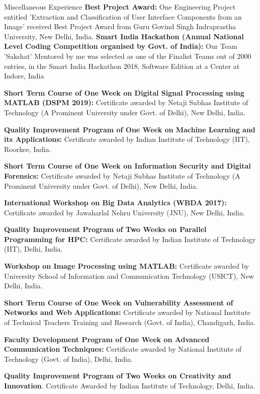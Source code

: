 
\begin{rubric}{Miscellaneous Experience}
    \entry*[2018] \textbf{Best Project Award:} One Engineering Project entitled 'Extraction and Classification of User Interface Components from an Image' received Best Project Award from Guru Govind Singh Indraprastha University, New Delhi, India.
    \entry*[2018] \textbf{Smart India Hackathon (Annual National Level Coding Competition organised by Govt. of India):} Our Team 'Sakshat' Mentored by me was selected as one of the Finalist Teams out of 2000 entries, in the Smart India Hackathon 2018, Software Edition at a Center at Indore, India
    
    \entry*[2019] \textbf{Short Term Course of One Week on Digital Signal Processing using MATLAB (DSPM 2019):} Certificate awarded by Netaji Subhas Institute of Technology (A Prominent University under Govt. of Delhi), New Delhi, India.
    
    \entry*[2018] \textbf{Quality Improvement Program of One Week on Machine Learning and its Applications:} Certificate awarded by Indian Institute of Technology (IIT), Roorkee, India.
    
    \entry*[2017] \textbf{Short Term Course of One Week on Information Security and Digital Forensics:} Certificate awarded by Netaji Subhas Institute of Technology (A Prominent University under Govt. of Delhi), New Delhi, India.
    
    \entry*[2017] \textbf{International Workshop on Big Data Analytics (WBDA 2017):} Certificate awarded by Jawaharlal Nehru University (JNU), New Delhi, India.
    
    \entry*[2016] \textbf{Quality Improvement Program of Two Weeks on Parallel Programming for HPC:} Certificate awarded by Indian Institute of Technology (IIT), Delhi, India.
    
    \entry*[2016] \textbf{Workshop on Image Processing using MATLAB:} Certificate awarded by University School of Information and Communication Technology (USICT), New Delhi, India.
    
    \entry*[2016] \textbf{Short Term Course of One Week on Vulnerability Assessment of Networks and Web Applications:} Certificate awarded by National Institute of Technical Teachers Training and Research (Govt. of India), Chandigarh, India.
    
    \entry*[2013] \textbf{Faculty Development Program of One Week on Advanced Communication Techniques:} Certificate awarded by National Institute of Technology (Govt. of India), Delhi, India.
    
    \entry*[2012] \textbf{Quality Improvement Program of Two Weeks on Creativity and Innovation}. Certificate Awarded by Indian Institute of Technology, Delhi, India.
    \end{rubric}